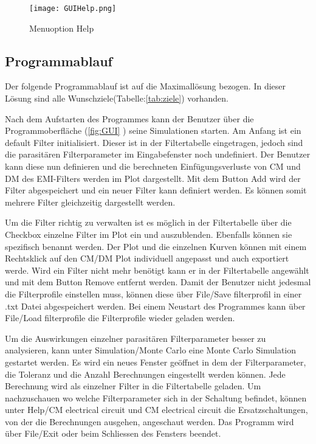 \begin{figure}[H]
	\centering
	\texttt{[image: GUIHelp.png]}
	\caption{Menuoption Help}
	\label{fig:GUIHelp}
\end{figure}

\subsection{Programmablauf} \label{subsec:programmablauf}

Der folgende Programmablauf ist auf die Maximallösung bezogen. In dieser Lösung sind alle Wunschziele(Tabelle:\ref{tab:ziele}) vorhanden.

Nach dem Aufstarten des Programmes kann der Benutzer über die Programmoberfläche (\ref{fig:GUI} ) seine Simulationen starten.
Am Anfang ist ein default Filter initialisiert. Dieser ist in der Filtertabelle eingetragen, jedoch sind die parasitären Filterparameter im Eingabefenster noch undefiniert. Der Benutzer kann diese nun definieren und die berechneten Einfügungsverluste von CM und DM des EMI-Filters werden im Plot dargestellt. Mit dem Button Add wird der Filter abgespeichert und ein neuer Filter kann definiert werden. Es können somit mehrere Filter gleichzeitig dargestellt werden. 

Um die Filter richtig zu verwalten ist es möglich in der Filtertabelle über die Checkbox einzelne Filter im Plot ein und auszublenden. Ebenfalls können sie spezifisch benannt werden. Der Plot und die einzelnen Kurven können mit einem Rechtsklick auf den CM/DM Plot individuell angepasst und auch exportiert werde. Wird ein Filter nicht mehr benötigt kann er in der Filtertabelle angewählt und mit dem Button Remove entfernt werden. Damit der Benutzer nicht jedesmal die Filterprofile einstellen muss, können diese über File/Save filterprofil in einer .txt Datei abgespeichert werden. Bei einem Neustart des Programmes kann über File/Load filterprofile die Filterprofile wieder geladen werden. 

Um die Auswirkungen einzelner parasitären Filterparameter besser zu analysieren, kann unter Simulation/Monte Carlo eine Monte Carlo Simulation gestartet werden. Es wird ein neues Fenster geöffnet in dem der Filterparameter, die Toleranz und die Anzahl Berechnungen eingestellt werden können. Jede Berechnung wird als einzelner Filter in die Filtertabelle geladen. Um nachzuschauen wo welche Filterparameter sich in der Schaltung befindet, können unter Help/CM electrical circuit und CM electrical circuit die Ersatzschaltungen, von der die Berechnungen ausgehen, angeschaut werden. Das Programm wird über File/Exit oder beim Schliessen des Fensters beendet.

